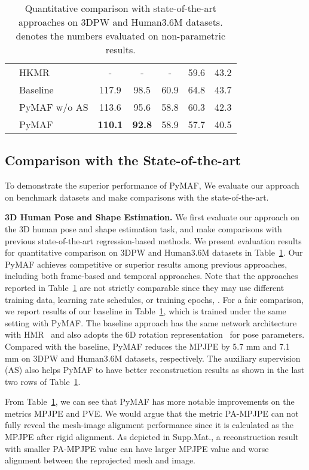 \documentclass[10pt,twocolumn,letterpaper]{article}
\begin{document}
\begin{table}[t]
\begin{tabular}{cl|ccc|cc}
          & HKMR~\cite{georgakis2020hierarchical} & -     & -     & -     & 59.6  & 43.2 \\
\cmidrule{2-7}          & Baseline & 117.9 & 98.5  & 60.9  & 64.8  & 43.7 \\
          & PyMAF w/o AS & 113.6 & 95.6  & 58.8  & 60.3  & 42.3 \\
          & PyMAF & \textbf{110.1} & \textbf{92.8} & 58.9  & 57.7  & 40.5 \\
    \bottomrule
    \end{tabular}\caption{Quantitative comparison with state-of-the-art approaches on 3DPW and Human3.6M datasets.  denotes the numbers evaluated on non-parametric results.}
    \vspace{-5mm}
  \label{tab:3dpose}\end{table}\addtolength{\tabcolsep}{5pt}

\subsection{Comparison with the State-of-the-art}
To demonstrate the superior performance of PyMAF, We evaluate our approach on benchmark datasets and make comparisons with the state-of-the-art.


\textbf{3D Human Pose and Shape Estimation.}
We first evaluate our approach on the 3D human pose and shape estimation task, and make comparisons with previous state-of-the-art regression-based methods.
We present evaluation results for quantitative comparison on 3DPW and Human3.6M datasets in Table~\ref{tab:3dpose}.
Our PyMAF achieves competitive or superior results among previous approaches, including both frame-based and temporal approaches.
Note that the approaches reported in Table~\ref{tab:3dpose} are not strictly comparable since they may use different training data, learning rate schedules, or training epochs, \etc.
For a fair comparison, we report results of our baseline in Table~\ref{tab:3dpose}, which is trained under the same setting with PyMAF.
The baseline approach has the same network architecture with HMR~\cite{kanazawa2018end} and also adopts the 6D rotation representation~\cite{zhou2019continuity} for pose parameters.
Compared with the baseline, PyMAF reduces the MPJPE by 5.7 mm and 7.1 mm on 3DPW and Human3.6M datasets, respectively.
The auxiliary supervision (AS) also helps PyMAF to have better reconstruction results as shown in the last two rows of Table~\ref{tab:3dpose}.


From Table~\ref{tab:3dpose}, we can see that PyMAF has more notable improvements on the metrics MPJPE and PVE.
We would argue that the metric PA-MPJPE can not fully reveal the mesh-image alignment performance since it is calculated as the MPJPE after rigid alignment.
As depicted in Supp.Mat., a reconstruction result with smaller PA-MPJPE value can have larger MPJPE value and worse alignment between the reprojected mesh and image.
\end{document}
